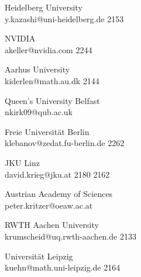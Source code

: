 \begin{multicols}{2}
 {Heidelberg University\\}%
 {y.kazashi@uni-heidelberg.de}%
 {2153} %
 {} %
 {} %
 {} %
 {} %

 {NVIDIA\\}%
 {akeller@nvidia.com}%
 {2244} %
 {} %
 {} %
 {} %
 {} %

 {Aarhus University\\}%
 {kiderlen@math.au.dk}%
 {2144} %
 {} %
 {} %
 {} %
 {} %

 {Queen's University Belfast\\}%
 {nkirk09@qub.ac.uk}%
 {} %
 {} %
 {} %
 {} %
 {} %

 {Freie Universit\"at Berlin\\}%
 {klebanov@zedat.fu-berlin.de}%
 {2262} %
 {} %
 {} %
 {} %
 {} %

 {JKU Linz\\}%
 {david.krieg@jku.at}%
 {2180} %
 {2162} %
 {} %
 {} %
 {} %

 {Austrian Academy of Sciences\\}%
 {peter.kritzer@oeaw.ac.at}%
 {} %
 {} %
 {} %
 {} %
 {} %

 {RWTH Aachen University\\}%
 {krumscheid@uq.rwth-aachen.de}%
 {2133} %
 {} %
 {} %
 {} %
 {} %

 {Universit\"at Leipzig\\}%
 {kuehn@math.uni-leipzig.de}%
 {2164} %
 {} %
 {} %
 {} %
 {} %


\end{multicols}
